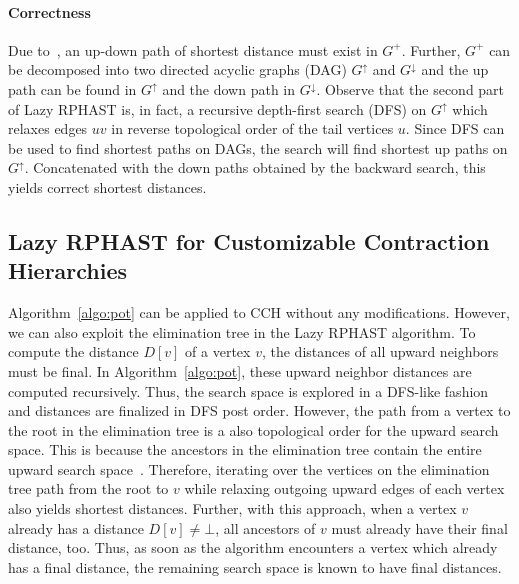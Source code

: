 \documentclass[manuscript,review]{acmart}
\newcommand*{\gchu}{G^{\uparrow}}
\newcommand*{\gchd}{G^{\downarrow}}
\begin{document}
\paragraph{Correctness}
Due to~\cite{gssv-erlrn-12}, an up-down path of shortest distance must exist in $G^+$.
Further, $G^+$ can be decomposed into two directed acyclic graphs (DAG) $\gchu$ and $\gchd$ and the up path can be found in $\gchu$ and the down path in $\gchd$.
Observe that the second part of Lazy RPHAST is, in fact, a recursive depth-first search (DFS) on $\gchu$ which relaxes edges $uv$ in reverse topological order of the tail vertices $u$.
Since DFS can be used to find shortest paths on DAGs, the search will find shortest up paths on $\gchu$.
Concatenated with the down paths obtained by the backward search, this yields correct shortest distances.

\subsection{Lazy RPHAST for Customizable Contraction Hierarchies}

Algorithm~\ref{algo:pot} can be applied to CCH without any modifications.
However, we can also exploit the elimination tree in the Lazy RPHAST algorithm.
To compute the distance $D[v]$ of a vertex $v$, the distances of all upward neighbors must be final.
In Algorithm~\ref{algo:pot}, these upward neighbor distances are computed recursively.
Thus, the search space is explored in a DFS-like fashion and distances are finalized in DFS post order.
However, the path from a vertex to the root in the elimination tree is a also topological order for the upward search space.
This is because the ancestors in the elimination tree contain the entire upward search space~\cite{bcrw-s-16}.
Therefore, iterating over the vertices on the elimination tree path from the root to $v$ while relaxing outgoing upward edges of each vertex also yields shortest distances.
Further, with this approach, when a vertex $v$ already has a distance $D[v] \neq \bot$, all ancestors of $v$ must already have their final distance, too.
Thus, as soon as the algorithm encounters a vertex which already has a final distance, the remaining search space is known to have final distances.
\end{document}
